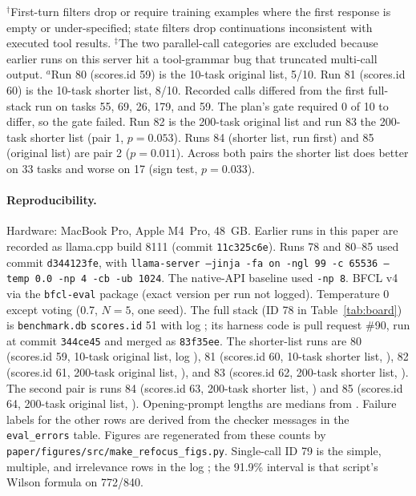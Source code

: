 \documentclass[11pt]{article}
\begin{document}
\begin{table}[!t]
\parbox{\linewidth}{\scriptsize $^\dagger$First-turn filters drop or require training examples where the first response is empty or under-specified; state filters drop continuations inconsistent with executed tool results. $^\ddagger$The two parallel-call categories are excluded because earlier runs on this server hit a tool-grammar bug that truncated multi-call output. $^{a}$Run 80 (scores.id 59) is the 10-task original list, 5/10. Run 81 (scores.id 60) is the 10-task shorter list, 8/10. Recorded calls differed from the first full-stack run on tasks 55, 69, 26, 179, and 59. The plan's gate required 0 of 10 to differ, so the gate failed. Run 82 is the 200-task original list and run 83 the 200-task shorter list (pair 1, $p=0.053$). Runs 84 (shorter list, run first) and 85 (original list) are pair 2 ($p=0.011$). Across both pairs the shorter list does better on 33 tasks and worse on 17 (sign test, $p=0.033$).}
\end{table}

\paragraph{Reproducibility.} Hardware: MacBook Pro, Apple M4~Pro, 48~GB. Earlier runs in this paper are recorded as llama.cpp build 8111 (commit \texttt{11c325c6e}). Runs 78 and 80--85 used commit \texttt{d344123fe}, with \texttt{llama-server --jinja -fa on -ngl 99 -c 65536 --temp 0.0 -np 4 -cb -ub 1024}. The native-API baseline used \texttt{-np 8}. BFCL v4 via the \texttt{bfcl-eval} package (exact version per run not logged). Temperature 0 except voting (0.7, $N{=}5$, one seed). The full stack (ID 78 in Table~\ref{tab:board}) is \texttt{benchmark.db} \texttt{scores.id} 51 with log ; its harness code is pull request \#90, run at commit \texttt{344ce45} and merged as \texttt{83f35ee}. The shorter-list runs are 80 (scores.id 59, 10-task original list, log ), 81 (scores.id 60, 10-task shorter list, ), 82 (scores.id 61, 200-task original list, ), and 83 (scores.id 62, 200-task shorter list, ). The second pair is runs 84 (scores.id 63, 200-task shorter list, ) and 85 (scores.id 64, 200-task original list, ). Opening-prompt lengths are medians from . Failure labels for the other rows are derived from the checker messages in the \texttt{eval\_errors} table. Figures are regenerated from these counts by \texttt{paper/figures/src/make\_refocus\_figs.py}. Single-call ID 79 is the simple, multiple, and irrelevance rows in the log ; the 91.9\% interval is that script's Wilson formula on 772/840.
\end{document}
